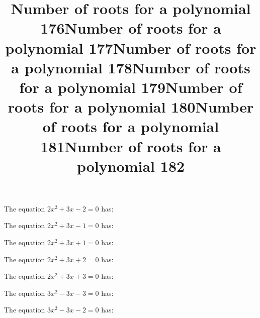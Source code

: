 \documentclass{article}
\begin{document}
\begin{category}
\begin{question}[multichoice]
\end{question}
\begin{question}[multichoice]
\title{Number of roots for a polynomial 176}
The equation $2 x^{2} + 3 x - 2=0$ has:


\end{question}
\begin{question}[multichoice]
\title{Number of roots for a polynomial 177}
The equation $2 x^{2} + 3 x - 1=0$ has:


\end{question}
\begin{question}[multichoice]
\title{Number of roots for a polynomial 178}
The equation $2 x^{2} + 3 x + 1=0$ has:


\end{question}
\begin{question}[multichoice]
\title{Number of roots for a polynomial 179}
The equation $2 x^{2} + 3 x + 2=0$ has:


\end{question}
\begin{question}[multichoice]
\title{Number of roots for a polynomial 180}
The equation $2 x^{2} + 3 x + 3=0$ has:


\end{question}
\begin{question}[multichoice]
\title{Number of roots for a polynomial 181}
The equation $3 x^{2} - 3 x - 3=0$ has:


\end{question}
\begin{question}[multichoice]
\title{Number of roots for a polynomial 182}
The equation $3 x^{2} - 3 x - 2=0$ has:


\end{question}
\end{category}
\end{document}
